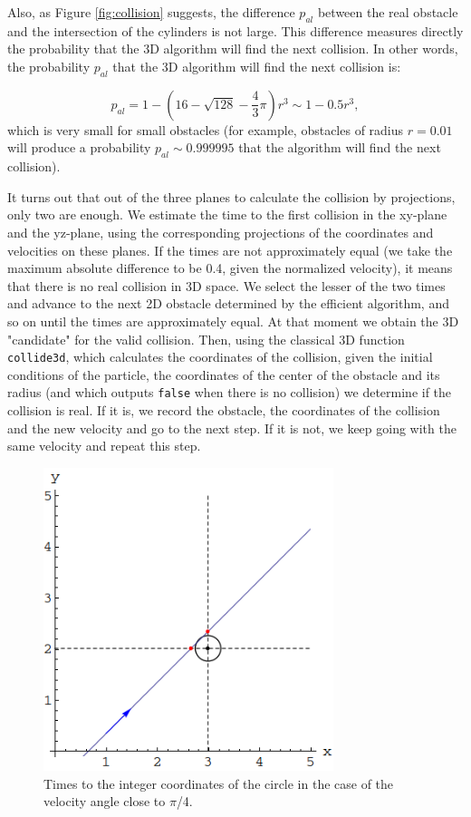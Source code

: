 \documentclass[prl,amsmath,amssymb, twocolumn, showpacs]{revtex4-1}
\newcommand{\pp}{p_{al}}
\begin{document}
Also, as Figure \ref{fig:collision} suggests, the difference $\pp$ between the real obstacle and the intersection of the cylinders is not large. This difference measures directly the probability that the 3D algorithm will find the next collision. In other words, the probability $\pp$ that the 3D algorithm will find the next collision is: 

\begin{equation}
\pp= 1-(16-\sqrt{128}-\frac{4}{3} \pi) r^3 \sim 1-0.5 r^3, 
\end{equation}
which is very small for small obstacles (for example, obstacles of radius $r=0.01$ will produce a probability $\pp \sim 0.999995$ that the algorithm will find the next collision). 

It turns out that out of the three planes to calculate the collision by projections, only two are enough. We estimate the time to the first collision in the xy-plane and the yz-plane, using the corresponding projections of the coordinates and velocities on these planes. If the times are not approximately equal (we take the maximum absolute difference to be 0.4, given the normalized velocity), it means that there is no real collision in 3D space. We select the lesser of the two times and advance to the next 2D obstacle determined by the efficient algorithm, and so on until the times are approximately equal. At that moment we obtain the 3D "candidate" for the valid collision. Then, using the classical 3D function \texttt{collide3d}, which calculates the coordinates of the collision, given the initial conditions of the particle, the coordinates of the center of the obstacle and its radius (and which outputs \texttt{false} when there is no collision) we determine if the collision is real. If it is, we record the obstacle, the coordinates of the collision and the new velocity and go to the next step. If it is not, we keep going with the same velocity and repeat this step.

\begin{figure}
\centering
\includegraphics [width=240pt]{fig03.png}
\caption{Times to the integer coordinates of the circle in the case of the velocity angle close to $\pi$/4.}
\label{fig:fig03}
\end{figure}
\end{document}
